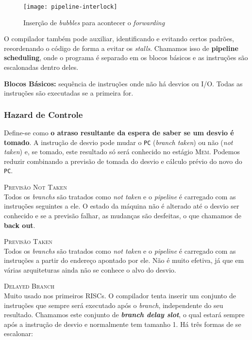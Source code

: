 \begin{figure}
  \texttt{[image: pipeline-interlock]}
  \label{fig:pipeline-interlock}
  \caption{Inserção de \textit{bubbles} para acontecer o \textit{forwarding}}
\end{figure}

O compilador também pode auxiliar, identificando e evitando certos padrões, reeordenando o código de forma a evitar os \textit{stalls}. Chamamos isso de \textbf{pipeline scheduling}, onde o programa é separado em os blocos básicos e as instruções são escalonadas dentro deles.

\textbf{Blocos Básicos:} sequência de instruções onde não há desvios ou I/O. Todas as instruções são executadas se a primeira for.




\subsubsection{Hazard de Controle}
Define-se como \textbf{o atraso resultante da espera de saber se um desvio é tomado}. A instrução de desvio pode mudar o \texttt{PC} (\textit{branch taken}) ou não (\textit{not taken}) e, se tomado, este resultado só será conhecido no estágio \textsc{Mem}. Podemos reduzir combinando a previsão de tomada do desvio e cálculo prévio do novo do \texttt{PC}.

\textsc{Previsão Not Taken}\\
Todos os \textit{branchs} são tratados como \textit{not taken} e o \textit{pipeline} é carregado com as instruções seguintes a ele. O estado da máquina não é alterado até o desvio ser conhecido e se a previsão falhar, as mudanças são desfeitas, o que chamamos de \textbf{back out}.

\textsc{Previsão Taken}\\
Todos os \textit{branchs} são tratados como \textit{not taken} e o \textit{pipeline} é carregado com as instruções a partir do endereço apontado por ele. Não é muito efetiva, já que em várias arquiteturas ainda não se conhece o alvo do desvio.

\textsc{Delayed Branch}\\
Muito usado nos primeiros RISCs. O compilador tenta inserir um conjunto de instruções que sempre será executado após o \textit{branch}, independente do seu resultado. Chamamos este conjunto de \textbf{\textit{branch delay slot}}, o qual estará sempre após a instrução de desvio e normalmente tem tamanho 1. Há três formas de se escalonar:

